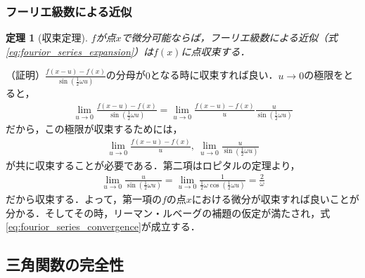 \documentclass[dvipdfmx,graphicx,14pt]{beamer}
\newtheorem{mytheorem}{定理}
\begin{document}
\begin{frame}[c]
    \frametitle{フーリエ級数による近似}
    \begin{mytheorem}[収束定理]
        $f$が点$x$で微分可能ならば，フーリエ級数による近似（式\eqref{eq:fourior_series_expansion}）は$f(x)$に点収束する．
    \end{mytheorem}
    \scriptsize
    （証明）$\frac{f(x-u) - f(x)}{\sin\left(\frac{1}{2}\omega u\right)}$の分母が$0$となる時に収束すれば良い．$u\to0$の極限をとると，
    \begin{align*}
        \lim_{u\to 0} \frac{f(x-u) - f(x)}{\sin\left(\frac{1}{2}\omega u\right)} = \lim_{u\to 0} \frac{f(x-u) - f(x)}{u} \frac{u}{\sin\left(\frac{1}{2}\omega u\right)}
    \end{align*}
    だから，この極限が収束するためには，
    \begin{align*}
        \lim_{u\to 0} \frac{f(x-u) - f(x)}{u},\ \lim_{u\to 0} \frac{u}{\sin\left(\frac{1}{2}\omega u\right)}
    \end{align*}
    が共に収束することが必要である．第二項はロピタルの定理より，
    \begin{align*}
        \lim_{u\to 0} \frac{u}{\sin\left(\frac{1}{2}\omega u\right)} = \lim_{u\to 0} \frac{1}{\frac{1}{2}\omega \cos\left(\frac{1}{2}\omega u\right)} = \frac{2}{\omega}
    \end{align*}
    だから収束する．よって，第一項の$f$の点$x$における微分が収束すれば良いことが分かる．そしてその時，リーマン・ルベーグの補題の仮定が満たされ，式\eqref{eq:fourior_series_convergence}が成立する．
\end{frame}

\subsection{三角関数の完全性}
\end{document}
